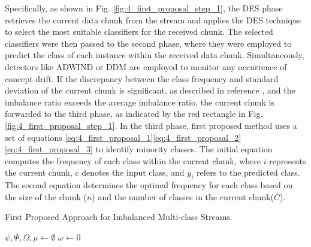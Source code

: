 Specifically, as shown in Fig. \ref{fig:4_first_proposal_step_1}, the DES phase retrieves the current data chunk from the stream and applies the DES technique to select the most suitable classifiers for the received chunk. The selected classifiers were then passed to the second phase, where they were employed to predict the class of each instance within the received data chunk. Simultaneously, detectors like ADWIND or DDM are employed to monitor any occurrence of concept drift. If the discrepancy between the class frequency and standard deviation of the current chunk is significant, as described in reference \cite{gama2004learning}, and the imbalance ratio exceeds the average imbalance ratio, the current chunk is forwarded to the third phase, as indicated by the red rectangle in Fig. \ref{fig:4_first_proposal_step_1}. In the third phase, first proposed method uses a set of equations \ref{eq:4_first_proposal_1}\ref{eq:4_first_proposal_2}\ref{eq:4_first_proposal_3}
to identify minority classes. The initial equation computes the frequency of each class within the current chunk, where $i$ represents the current chunk, $c$ denotes the input class, and $y_i$ refers to the predicted class. The second equation determines the optimal frequency for each class based on the size of the chunk ($n$) and the number of classes in the current chunk($C$).

\begin{algorithm}[H]
	\caption{First Proposed Approach for Imbalanced Multi-class Streams.}
	\label{alg:4_alg_1}
	\BlankLine
	$\psi, \Psi, \Omega, \mu \gets \emptyset$\;
	$\omega \gets 0$\;
	\end{algorithm}

